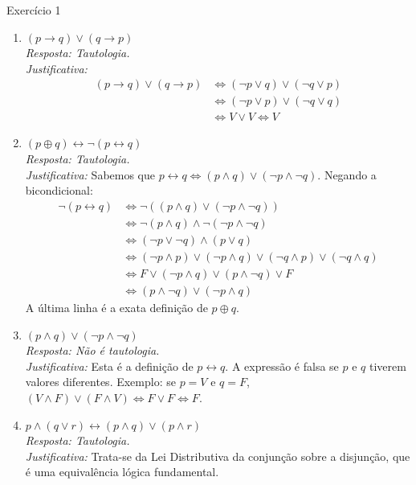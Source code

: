 \documentclass[a4paper,11pt]{article}
\theoremstyle{definition}
\theoremstyle{plain}
\theoremstyle{remark}
\newcounter{questao}[section]
\begin{document}
\begin{questaoManually}{Exercício 1}
\begin{enumerate}
\item \textbf{$(p \to q) \lor (q \to p)$} \\
\textit{Resposta: Tautologia.} \\
\textit{Justificativa:}
\begin{align*}
(p \to q) \lor (q \to p) &\iff (\neg p \lor q) \lor (\neg q \lor p) \\
&\iff (\neg p \lor p) \lor (\neg q \lor q) \\
&\iff V \lor V \iff V
\end{align*}

\item \textbf{$(p \oplus q) \leftrightarrow \neg(p \leftrightarrow q)$} \\
\textit{Resposta: Tautologia.} \\
\textit{Justificativa:} Sabemos que $p \leftrightarrow q \iff (p \land q) \lor (\neg p \land \neg q)$. Negando a bicondicional:
\begin{align*}
\neg(p \leftrightarrow q) &\iff \neg((p \land q) \lor (\neg p \land \neg q)) \\
&\iff \neg(p \land q) \land \neg(\neg p \land \neg q) \\
&\iff (\neg p \lor \neg q) \land (p \lor q) \\
&\iff (\neg p \land p) \lor (\neg p \land q) \lor (\neg q \land p) \lor (\neg q \land q) \\
&\iff F \lor (\neg p \land q) \lor (p \land \neg q) \lor F \\
&\iff (p \land \neg q) \lor (\neg p \land q)
\end{align*}
A última linha é a exata definição de $p \oplus q$.

\item \textbf{$(p \land q) \lor (\neg p \land \neg q)$} \\
\textit{Resposta: Não é tautologia.} \\
\textit{Justificativa:} Esta é a definição de $p \leftrightarrow q$. A expressão é falsa se $p$ e $q$ tiverem valores diferentes. Exemplo: se $p = V$ e $q = F$, $(V \land F) \lor (F \land V) \iff F \lor F \iff F$.

\item \textbf{$p \land (q \lor r) \leftrightarrow (p \land q) \lor (p \land r)$} \\
\textit{Resposta: Tautologia.} \\
\textit{Justificativa:} Trata-se da Lei Distributiva da conjunção sobre a disjunção, que é uma equivalência lógica fundamental.


\end{enumerate}
\end{questaoManually}
\end{document}
